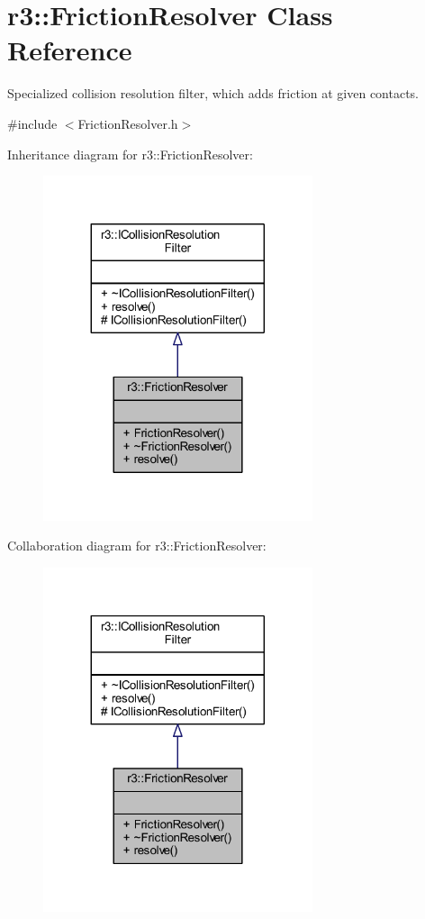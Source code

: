 \hypertarget{classr3_1_1_friction_resolver}{}\section{r3\+:\+:Friction\+Resolver Class Reference}
\label{classr3_1_1_friction_resolver}


Specialized collision resolution filter, which adds friction at given contacts.  




{\ttfamily \#include $<$Friction\+Resolver.\+h$>$}



Inheritance diagram for r3\+:\+:Friction\+Resolver\+:\nopagebreak
\begin{figure}[H]
\begin{center}
\leavevmode
\includegraphics[width=224pt]{classr3_1_1_friction_resolver__inherit__graph}
\end{center}
\end{figure}


Collaboration diagram for r3\+:\+:Friction\+Resolver\+:\nopagebreak
\begin{figure}[H]
\begin{center}
\leavevmode
\includegraphics[width=224pt]{classr3_1_1_friction_resolver__coll__graph}
\end{center}
\end{figure}
